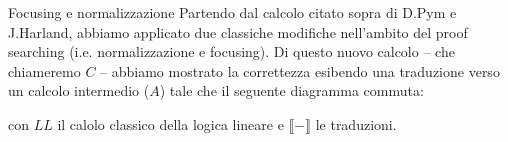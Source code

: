 \documentclass{beamer}
\begin{document}
% 

\begin{frame}{Focusing e normalizzazione}
	Partendo dal calcolo citato sopra di D.Pym e J.Harland, abbiamo applicato due classiche modifiche nell'ambito del proof searching (i.e. normalizzazione e focusing).
	Di questo nuovo calcolo -- che chiameremo $C$ -- abbiamo mostrato la correttezza esibendo una traduzione verso un calcolo intermedio ($A$) tale che il seguente diagramma commuta:
	\begin{center}
	\end{center}
	con $LL$ il calolo classico della logica lineare e $\llbracket - \rrbracket$ le traduzioni.
\end{frame}
\end{document}
